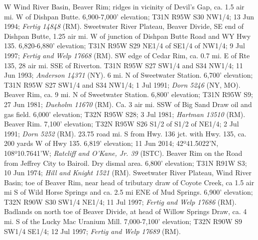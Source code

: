 W Wind River Basin, Beaver Rim; ridges in vicinity of Devil's Gap, ca. 1.5 air
mi. W of Dishpan Butte. 6,900-7,000' elevation; T31N R95W S30 NW1/4;
13 Jun 1994; \textit{Fertig 14848} (RM).
Sweetwater River Plateau, Beaver Divide, SE end of Dishpan Butte, 1.25 air mi.
W of junction of Dishpan Butte Road and WY Hwy 135. 6,820-6,880' elevation;
T31N R95W S29 NE1/4 of SE1/4 of NW1/4; 9 Jul 1997;
\textit{Fertig and Welp 17668} (RM).
SW edge of Cedar Rim, ca. 0.7 mi. E of Rte 135, 28 air mi. SSE of Riverton.
T31N R95W S27 SW1/4 and S34 NW1/4; 11 Jun 1993; \textit{Anderson 14371} (NY).
6 mi. N of Sweetwater Station. 6,700' elevation; T31N R95W S27 SW1/4 and S34
NW1/4; 1 Jul 1991; \textit{Dorn 5246} (NY, MO).
Beaver Rim, ca. 9 mi. N of Sweetwater Station. 6,800' elevation; T31N R95W S9;
27 Jun 1981; \textit{Dueholm 11670} (RM).
Ca. 3 air mi. SSW of Big Sand Draw oil and gas field. 6,000' elevation;
T32N R95W S28; 3 Jul 1981; \textit{Hartman 13510} (RM).
Beaver Rim. 7,100' elevation; T32N R95W S26 S1/2 of S1/2 of NE1/4; 2 Jul 1991;
\textit{Dorn 5252} (RM).
23.75 road mi. S from Hwy. 136 jct. with Hwy. 135, ca. 200 yards W of Hwy 135.
6,819' elevation; 11 Jun 2014; 42º41.5022'N, 108º10.7641'W;
\textit{Ratcliff and O'Kane, Jr. 39} (ISTC).
Beaver Rim on the Road from Jeffrey City to Bairoil. Dry dismal area.
6,800' elevation; T31N R91W S3; 10 Jun 1974; \textit{Hill and Knight 1521} (RM).
Sweetwater River Plateau, Wind River Basin; toe of Beaver Rim, near head of
tributary draw of Coyote Creek, ca 1.5 air mi S of Wild Horse Springs and ca.
2.5 mi ENE of Mud Springs. 6,900' elevation; T32N R90W S30 SW1/4 NE1/4;
11 Jul 1997; \textit{Fertig and Welp 17686} (RM).
Badlands on north toe of Beaver Divide, at head of Willow Springs Draw, ca. 4
mi. S of the Lucky Mac Uranium Mill. 7,000-7,100' elevation; T32N R90W S9 SW1/4
SE1/4; 12 Jul 1997; \textit{Fertig and Welp 17689} (RM).


